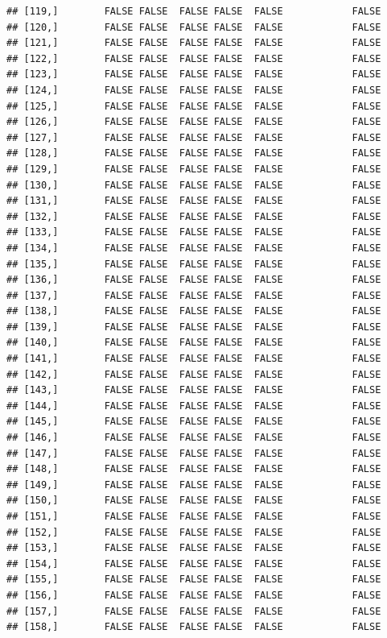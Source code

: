\documentclass[
  english,
  man,floatsintext]{apa6}
\begin{document}
\begin{verbatim}
## [119,]        FALSE FALSE  FALSE FALSE  FALSE            FALSE
## [120,]        FALSE FALSE  FALSE FALSE  FALSE            FALSE
## [121,]        FALSE FALSE  FALSE FALSE  FALSE            FALSE
## [122,]        FALSE FALSE  FALSE FALSE  FALSE            FALSE
## [123,]        FALSE FALSE  FALSE FALSE  FALSE            FALSE
## [124,]        FALSE FALSE  FALSE FALSE  FALSE            FALSE
## [125,]        FALSE FALSE  FALSE FALSE  FALSE            FALSE
## [126,]        FALSE FALSE  FALSE FALSE  FALSE            FALSE
## [127,]        FALSE FALSE  FALSE FALSE  FALSE            FALSE
## [128,]        FALSE FALSE  FALSE FALSE  FALSE            FALSE
## [129,]        FALSE FALSE  FALSE FALSE  FALSE            FALSE
## [130,]        FALSE FALSE  FALSE FALSE  FALSE            FALSE
## [131,]        FALSE FALSE  FALSE FALSE  FALSE            FALSE
## [132,]        FALSE FALSE  FALSE FALSE  FALSE            FALSE
## [133,]        FALSE FALSE  FALSE FALSE  FALSE            FALSE
## [134,]        FALSE FALSE  FALSE FALSE  FALSE            FALSE
## [135,]        FALSE FALSE  FALSE FALSE  FALSE            FALSE
## [136,]        FALSE FALSE  FALSE FALSE  FALSE            FALSE
## [137,]        FALSE FALSE  FALSE FALSE  FALSE            FALSE
## [138,]        FALSE FALSE  FALSE FALSE  FALSE            FALSE
## [139,]        FALSE FALSE  FALSE FALSE  FALSE            FALSE
## [140,]        FALSE FALSE  FALSE FALSE  FALSE            FALSE
## [141,]        FALSE FALSE  FALSE FALSE  FALSE            FALSE
## [142,]        FALSE FALSE  FALSE FALSE  FALSE            FALSE
## [143,]        FALSE FALSE  FALSE FALSE  FALSE            FALSE
## [144,]        FALSE FALSE  FALSE FALSE  FALSE            FALSE
## [145,]        FALSE FALSE  FALSE FALSE  FALSE            FALSE
## [146,]        FALSE FALSE  FALSE FALSE  FALSE            FALSE
## [147,]        FALSE FALSE  FALSE FALSE  FALSE            FALSE
## [148,]        FALSE FALSE  FALSE FALSE  FALSE            FALSE
## [149,]        FALSE FALSE  FALSE FALSE  FALSE            FALSE
## [150,]        FALSE FALSE  FALSE FALSE  FALSE            FALSE
## [151,]        FALSE FALSE  FALSE FALSE  FALSE            FALSE
## [152,]        FALSE FALSE  FALSE FALSE  FALSE            FALSE
## [153,]        FALSE FALSE  FALSE FALSE  FALSE            FALSE
## [154,]        FALSE FALSE  FALSE FALSE  FALSE            FALSE
## [155,]        FALSE FALSE  FALSE FALSE  FALSE            FALSE
## [156,]        FALSE FALSE  FALSE FALSE  FALSE            FALSE
## [157,]        FALSE FALSE  FALSE FALSE  FALSE            FALSE
## [158,]        FALSE FALSE  FALSE FALSE  FALSE            FALSE

\end{verbatim}
\end{document}
